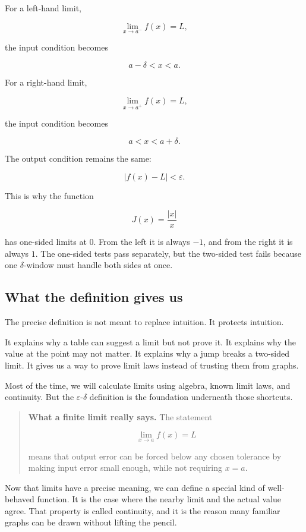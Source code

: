For a left-hand limit,

\[
\lim_{x\to a^-}f(x)=L,
\]

the input condition becomes

\[
a-\delta<x<a.
\]

For a right-hand limit,

\[
\lim_{x\to a^+}f(x)=L,
\]

the input condition becomes

\[
a<x<a+\delta.
\]

The output condition remains the same:

\[
|f(x)-L|<\varepsilon.
\]

This is why the function

\[
J(x)=\frac{|x|}{x}
\]

has one-sided limits at \(0\).  From the left it is always \(-1\), and from the right it is always \(1\).  The one-sided tests pass separately, but the two-sided test fails because one \(\delta\)-window must handle both sides at once.

\subsection{What the definition gives us}
\label{subsec:what-epsilon-delta-gives}

The precise definition is not meant to replace intuition.  It protects intuition.

It explains why a table can suggest a limit but not prove it.  It explains why the value at the point may not matter.  It explains why a jump breaks a two-sided limit.  It gives us a way to prove limit laws instead of trusting them from graphs.

Most of the time, we will calculate limits using algebra, known limit laws, and continuity.  But the \(\varepsilon\)-\(\delta\) definition is the foundation underneath those shortcuts.

\begin{quote}
\textbf{What a finite limit really says.}
The statement

\[
\lim_{x\to a}f(x)=L
\]

means that output error can be forced below any chosen tolerance by making input error small enough, while not requiring \(x=a\).
\end{quote}

Now that limits have a precise meaning, we can define a special kind of well-behaved function.  It is the case where the nearby limit and the actual value agree.  That property is called continuity, and it is the reason many familiar graphs can be drawn without lifting the pencil.


